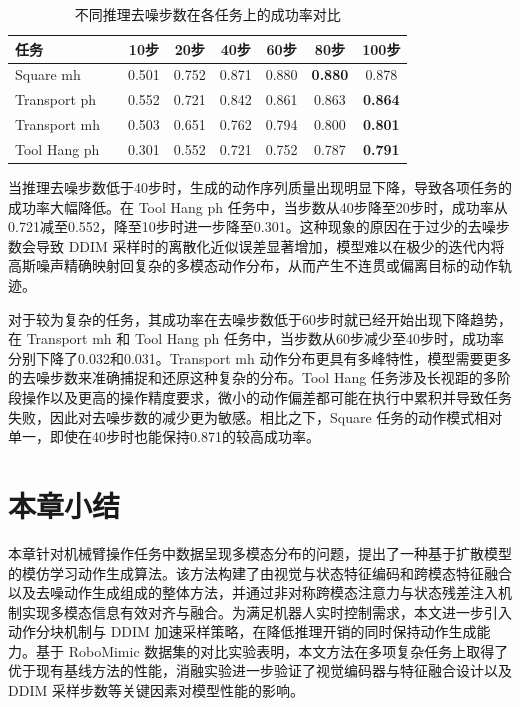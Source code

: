 \begin{table}[H]
  \centering
  \caption{不同推理去噪步数在各任务上的成功率对比}
  \label{tab:ablation_ddim}
  \begin{tabular}{lccccccc} %
    \toprule
    任务 &  & 10步 & 20步 & 40步 & 60步 & 80步 & 100步 \\ %
    \midrule
    Square mh      &  & 0.501 & 0.752 & 0.871 & 0.880 & \textbf{0.880} & 0.878 \\
    Transport ph   &  & 0.552 & 0.721 & 0.842 & 0.861 & 0.863 & \textbf{0.864} \\
    Transport mh   &  & 0.503 & 0.651 & 0.762 & 0.794 & 0.800 & \textbf{0.801} \\
    Tool Hang ph   &  & 0.301 & 0.552 & 0.721 & 0.752 & 0.787 & \textbf{0.791} \\
    \bottomrule
  \end{tabular}
\end{table}

当推理去噪步数低于40步时，生成的动作序列质量出现明显下降，导致各项任务的成功率大幅降低。在 Tool Hang ph 任务中，当步数从40步降至20步时，成功率从0.721减至0.552，降至10步时进一步降至0.301。这种现象的原因在于过少的去噪步数会导致 DDIM 采样时的离散化近似误差显著增加，模型难以在极少的迭代内将高斯噪声精确映射回复杂的多模态动作分布，从而产生不连贯或偏离目标的动作轨迹。

对于较为复杂的任务，其成功率在去噪步数低于60步时就已经开始出现下降趋势，在 Transport mh 和 Tool Hang ph 任务中，当步数从60步减少至40步时，成功率分别下降了0.032和0.031。Transport mh 动作分布更具有多峰特性，模型需要更多的去噪步数来准确捕捉和还原这种复杂的分布。Tool Hang 任务涉及长视距的多阶段操作以及更高的操作精度要求，微小的动作偏差都可能在执行中累积并导致任务失败，因此对去噪步数的减少更为敏感。相比之下，Square 任务的动作模式相对单一，即使在40步时也能保持0.871的较高成功率。
\section{本章小结}
\label{sec:chapter3_summary}
本章针对机械臂操作任务中数据呈现多模态分布的问题，提出了一种基于扩散模型的模仿学习动作生成算法。该方法构建了由视觉与状态特征编码和跨模态特征融合以及去噪动作生成组成的整体方法，并通过非对称跨模态注意力与状态残差注入机制实现多模态信息有效对齐与融合。为满足机器人实时控制需求，本文进一步引入动作分块机制与 DDIM 加速采样策略，在降低推理开销的同时保持动作生成能力。基于 RoboMimic 数据集的对比实验表明，本文方法在多项复杂任务上取得了优于现有基线方法的性能，消融实验进一步验证了视觉编码器与特征融合设计以及 DDIM 采样步数等关键因素对模型性能的影响。
